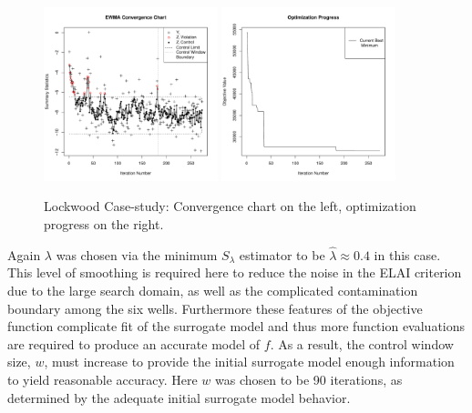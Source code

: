 \documentclass[12pt]{article}
\def \lockLamb {
        0.4
}
\begin{document}

%
\begin{figure}[htb]
        \centering
        \includegraphics[width=0.45\textwidth]{./figures/ewmaConvChartLock6Three20000End.pdf}
        \includegraphics[width=0.45\textwidth]{./figures/bestZLock6Three20000End.pdf}
        \caption{Lockwood Case-study: Convergence chart on the left, optimization progress on the right.}
        \label{lock6EWMAEnd}
\end{figure}
%
%

%
Again $\lambda$ was chosen via the minimum $S_\lambda$ estimator to be $\hat\lambda\approx\lockLamb$ in this case. 
%
This level of smoothing is required here to reduce the noise in the ELAI criterion due to the large search domain, as well as the complicated contamination boundary among the six wells.
%
Furthermore these features of the objective function complicate fit of the surrogate model and thus more function evaluations are required to produce an accurate model of $f$. %
As a result, the control window size, $w$, must increase to provide the initial surrogate model enough information to yield reasonable accuracy. 
Here $w$ was chosen to be 90 iterations, as determined by the adequate initial surrogate model behavior. %
\end{document}
